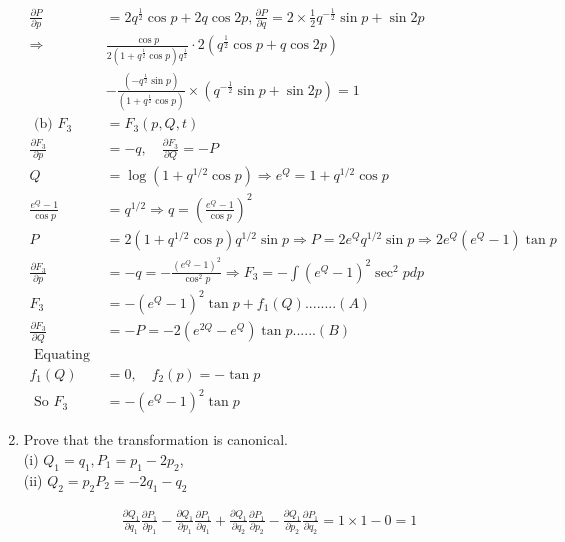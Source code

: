 \begin{enumerate}
\begin{answer}
\begin{align*}
		\frac{\partial P}{\partial p}&=2 q^{\frac{1}{2}} \cos p+2 q \cos 2 p, \frac{\partial P}{\partial q}=2 \times \frac{1}{2} q^{-\frac{1}{2}} \sin p+\sin 2 p\\
		\Rightarrow &\frac{\cos p}{2\left(1+q^{\frac{1}{2}} \cos p\right) q^{\frac{1}{2}}} \cdot 2\left(q^{\frac{1}{2}} \cos p+q \cos 2 p\right)\\&-\frac{\left(-q^{\frac{1}{2}} \sin p\right)}{\left(1+q^{\frac{1}{2}} \cos p\right)} \times\left(q^{-\frac{1}{2}} \sin p+\sin 2 p\right)=1\\
		\text { (b) } F_{3}&=F_{3}(p, Q, t)\\
		\frac{\partial F_{3}}{\partial p}&=-q, \quad \frac{\partial F_{3}}{\partial Q}=-P\\
		Q&=\log \left(1+q^{1 / 2} \cos p\right) \Rightarrow e^{Q}=1+q^{1 / 2} \cos p\\
		\frac{e^{Q}-1}{\cos p}&=q^{1 / 2} \Rightarrow q=\left(\frac{e^{Q}-1}{\cos p}\right)^{2}\\
		P&=2\left(1+q^{1 / 2} \cos p\right) q^{1 / 2} \sin p \Rightarrow P=2 e^{Q} q^{1 / 2} \sin p \Rightarrow 2 e^{Q}\left(e^{Q}-1\right) \tan p\\
		\frac{\partial F_{3}}{\partial p}&=-q=-\frac{\left(e^{Q}-1\right)^{2}}{\cos ^{2} p} \Rightarrow F_{3}=-\int\left(e^{Q}-1\right)^{2} \sec ^{2} p d p\\
		F_{3}&=-\left(e^{Q}-1\right)^{2} \tan p+f_{1}(Q)........(A)\\
		\frac{\partial F_{3}}{\partial Q}&=-P=-2\left(e^{2 Q}-e^{Q}\right) \tan p......(B)\\
		\text { Equating A and B }\\
		f_{1}(Q)&=0, \quad f_{2}(p)=-\tan p\\
		\text { So } F_{3}&=-\left(e^{Q}-1\right)^{2} \tan p
		\end{align*}
	\end{answer}
	\item Prove that the transformation is canonical.\\
	(i) $Q_{1}=q_{1}, P_{1}=p_{1}-2 p_{2}$,\\
	(ii) $Q_{2}=p_{2} P_{2}=-2 q_{1}-q_{2}$
	\begin{answer}
		\begin{align*}
		&\frac{\partial Q_{1}}{\partial q_{1}} \frac{\partial P_{1}}{\partial p_{1}}-\frac{\partial Q_{1}}{\partial p_{1}} \frac{\partial P_{1}}{\partial q_{1}}+\frac{\partial Q_{1}}{\partial q_{2}} \frac{\partial P_{1}}{\partial p_{2}}-\frac{\partial Q_{1}}{\partial p_{2}} \frac{\partial P_{1}}{\partial q_{2}}=1 \times 1-0=1\\

\end{align*}
\end{answer}
\end{enumerate}

